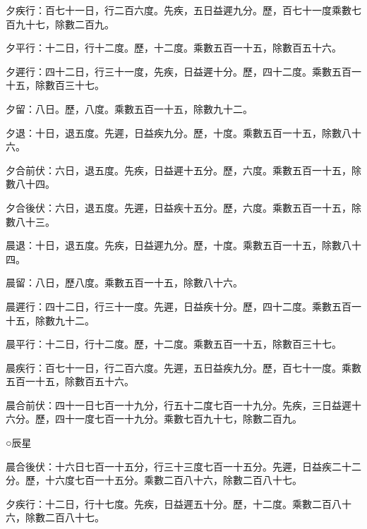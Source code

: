 \begin{pinyinscope}
 夕疾行：百七十一日，行二百六度。先疾，五日益遲九分。歷，百七十一度乘數七百九十七，除數二百九。



 夕平行：十二日，行十二度。歷，十二度。乘數五百一十五，除數百五十六。



 夕遲行：四十二日，行三十一度，先疾，日益遲十分。歷，四十二度。乘數五百一十五，除數百三十七。



 夕留：八日。歷，八度。乘數五百一十五，除數九十二。



 夕退：十日，退五度。先遲，日益疾九分。歷，十度。乘數五百一十五，除數八十六。



 夕合前伏：六日，退五度。先疾，日益遲十五分。歷，六度。乘數五百一十五，除數八十四。



 夕合後伏：六日，退五度。先遲，日益疾十五分。歷，六度。乘數五百一十五，除數八十三。



 晨退：十日，退五度。先疾，日益遲九分。歷，十度。乘數五百一十五，除數八十四。



 晨留：八日，歷八度。乘數五百一十五，除數八十六。



 晨遲行：四十二日，行三十一度。先遲，日益疾十分。歷，四十二度。乘數五百一十五，除數九十二。



 晨平行：十二日，行十二度。歷，十二度。乘數五百一十五，除數百三十七。



 晨疾行：百七十一日，行二百六度。先遲，五日益疾九分。歷，百七十一度。乘數五百一十五，除數百五十六。



 晨合前伏：四十一日七百一十九分，行五十二度七百一十九分。先疾，三日益遲十六分。歷，四十一度七百一十九分。乘數七百九十七，除數二百九。



 ○辰星



 晨合後伏：十六日七百一十五分，行三十三度七百一十五分。先遲，日益疾二十二分。歷，十六度七百一十五分。乘數二百八十六，除數二百八十七。



 夕疾行：十二日，行十七度。先疾，日益遲五十分。歷，十二度。乘數二百八十六，除數二百八十七。




\end{pinyinscope}

